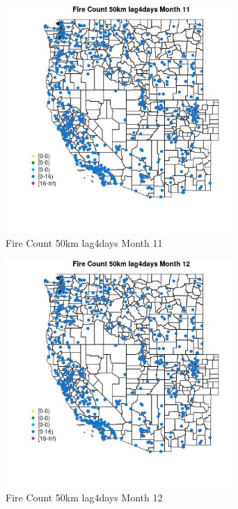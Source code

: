 \begin{figure} 
\centering  
\includegraphics[width=0.77\textwidth]{Code_Outputs/Report_ML_input_PM25_Step4_part_e_de_duplicated_aves_compiled_2019-05-21wNAs_MapObsMo11Fire_Count_50km_lag4days.jpg} 
\caption{\label{fig:Report_ML_input_PM25_Step4_part_e_de_duplicated_aves_compiled_2019-05-21wNAsMapObsMo11Fire_Count_50km_lag4days}Fire Count 50km lag4days Month 11} 
\end{figure} 
 

\begin{figure} 
\centering  
\includegraphics[width=0.77\textwidth]{Code_Outputs/Report_ML_input_PM25_Step4_part_e_de_duplicated_aves_compiled_2019-05-21wNAs_MapObsMo12Fire_Count_50km_lag4days.jpg} 
\caption{\label{fig:Report_ML_input_PM25_Step4_part_e_de_duplicated_aves_compiled_2019-05-21wNAsMapObsMo12Fire_Count_50km_lag4days}Fire Count 50km lag4days Month 12} 
\end{figure} 
 

